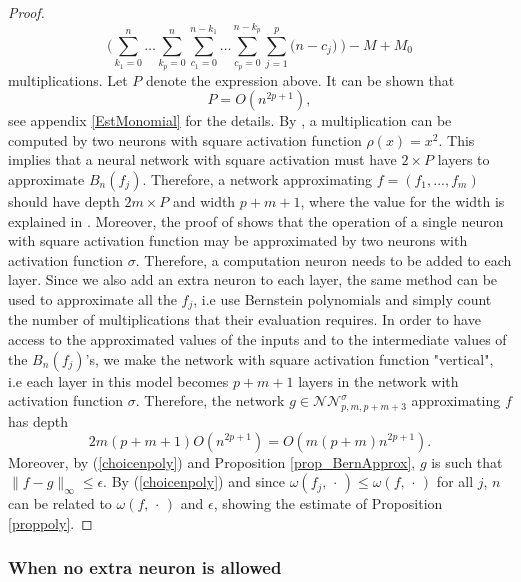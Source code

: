 \documentclass[anon,12pt]{colt2021} %
\begin{document}
\begin{proof}
\begin{equation*}
    \bigg( \sum_{k_{1}=0}^{n} \dots \sum_{k_{p}=0}^{n} \sum_{c_{1}=0}^{n-k_{1}} \dots \sum_{c_{p}=0}^{n - k_{p}} \sum_{j=1}^{p} \big( n-c_{j} \big) \ \bigg) - M + M_{0}
\end{equation*}
multiplications. Let $P$ denote the expression above. It can be shown that
\begin{equation*}
    P = O(n^{2p+1}),
\end{equation*}
see appendix \ref{EstMonomial} for the details. By \citep[Lemma 4.3]{kidger2019universal}, a multiplication can be computed by two neurons with square activation function $\rho (x) = x^{2}$. This implies that a neural network with square activation must have $2 \times P$ layers to approximate $B_{n}(f_{j})$. Therefore, a network approximating $f = (f_{1}, ..., f_{m})$ should have depth $2m \times P$ and width $p+m+1$, where the value for the width is explained in \cite{kidger2019universal}. Moreover, the proof of \citep[Proposition 4.11]{kidger2019universal} shows that the operation of a single neuron with square activation function may be approximated by two neurons with activation function $\sigma$. Therefore, a computation neuron needs to be added to each layer. Since we also add an extra neuron to each layer, the same method can be used to approximate all the $f_{j}$, i.e use Bernstein polynomials and simply count the number of multiplications that their evaluation requires. In order to have access to the approximated values of the inputs and to the intermediate values of the $B_{n}(f_{j})$'s, we make the network with square activation function "vertical", i.e each layer in this model becomes $p+m+1$ layers in the network with activation function $\sigma$. Therefore, the network $g \in \mathcal{NN}_{p,m,p+m+3}^{\sigma}$ approximating $f$ has depth
\begin{equation} \label{depthpoly}
    2m(p+m+1) O(n^{2p+1}) = O(m(p+m) n^{2p+1}).
\end{equation}
Moreover, by (\ref{choicenpoly}) and Proposition \ref{prop_BernApprox}, $g$ is such that $\| f - g \|_{\infty} \leq \epsilon$. By (\ref{choicenpoly}) and since $\omega(f_{j}, \, \cdot \,) \leq \omega(f, \, \cdot \,)$ for all $j$, $n$ can be related to $\omega(f, \, \cdot \,)$ and $\epsilon$, showing the estimate of Proposition \ref{proppoly}.
\end{proof}

\subsubsection{When no extra neuron is allowed} \label{InverseEst}
\end{document}
